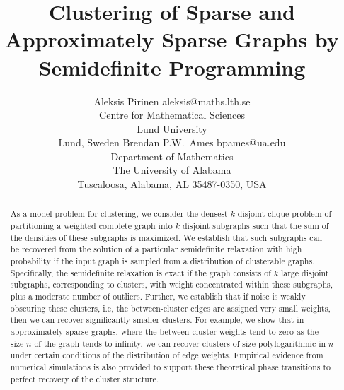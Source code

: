 \documentclass[twoside,11pt]{article}
\newcommand{\0}{\bs{0}}
\begin{document}
\title{Clustering of Sparse and Approximately Sparse Graphs by Semidefinite Programming}
\author{\name Aleksis Pirinen \email aleksis@maths.lth.se \\
	\addr Centre for Mathematical Sciences \\
	Lund University\\
	Lund, Sweden
	\AND
	\name Brendan P.W.~Ames \email bpames@ua.edu \\
	\addr Department of Mathematics\\
	The University of Alabama\\
	Tuscaloosa, Alabama, AL 35487-0350, USA
	}



\maketitle
\begin{abstract}%
As a model problem for clustering, we consider the densest $k$-disjoint-clique problem of partitioning a weighted complete
graph into
$k$ disjoint subgraphs such that the sum of the densities of these subgraphs is maximized.
We establish that such subgraphs can be recovered from the solution of a particular
semidefinite relaxation with high probability if the input graph is sampled from a distribution of clusterable graphs.
Specifically, the semidefinite relaxation is exact if the graph
consists of \(k\) large disjoint subgraphs, corresponding to clusters, with weight concentrated within these subgraphs,
plus a moderate number of outliers.
Further, we establish that if noise is weakly obscuring these clusters, i.e, the between-cluster edges are assigned
very small weights,
then we can recover significantly smaller clusters.
For example, we show that in approximately sparse graphs, where the between-cluster weights tend to zero as the size $n$ of the graph tends to infinity, we can recover clusters of size polylogarithmic in $n$
under certain conditions of the distribution of edge weights.
Empirical evidence from
numerical simulations is also provided to support these theoretical phase transitions to perfect recovery of the cluster structure.
\end{abstract}
\end{document}
